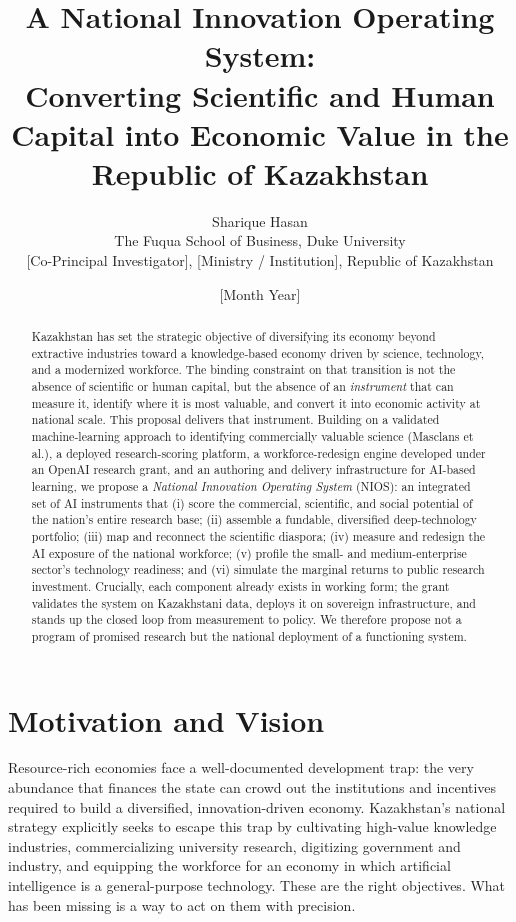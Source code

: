 \documentclass[11pt]{article}
\title{\bfseries A National Innovation Operating System:\\
Converting Scientific and Human Capital into Economic Value in the Republic of Kazakhstan}
\author{
  Sharique Hasan\\
  \small The Fuqua School of Business, Duke University\\[4pt]
  [Co-Principal Investigator], [Ministry / Institution], Republic of Kazakhstan
}
\date{[Month Year]}
\begin{document}
\maketitle

\begin{abstract}
\noindent
Kazakhstan has set the strategic objective of diversifying its economy beyond
extractive industries toward a knowledge-based economy driven by science,
technology, and a modernized workforce. The binding constraint on that
transition is not the absence of scientific or human capital, but the absence of
an \emph{instrument} that can measure it, identify where it is most valuable, and
convert it into economic activity at national scale. This proposal delivers that
instrument. Building on a validated machine-learning approach to identifying
commercially valuable science (Masclans et al.), a deployed research-scoring
platform, a workforce-redesign engine developed under an
OpenAI research grant, and an authoring and delivery infrastructure for AI-based
learning, we propose a \emph{National Innovation Operating System} (NIOS):
an integrated set of AI instruments that (i) score the commercial, scientific,
and social potential of the nation's entire research base; (ii) assemble a
fundable, diversified deep-technology portfolio; (iii) map and reconnect the
scientific diaspora; (iv) measure and redesign the AI exposure of the national
workforce; (v) profile the small- and medium-enterprise sector's technology
readiness; and (vi) simulate the marginal returns to public research investment.
Crucially, each component already exists in working form; the grant validates the
system on Kazakhstani data, deploys it on sovereign infrastructure, and stands up
the closed loop from measurement to policy. We therefore propose not a program of
promised research but the national deployment of a functioning system.
\end{abstract}

\section{Motivation and Vision}

Resource-rich economies face a well-documented development trap: the very
abundance that finances the state can crowd out the institutions and incentives
required to build a diversified, innovation-driven economy. Kazakhstan's national
strategy explicitly seeks to escape this trap by cultivating high-value
knowledge industries, commercializing university research, digitizing government
and industry, and equipping the workforce for an economy in which artificial
intelligence is a general-purpose technology. These are the right objectives.
What has been missing is a way to act on them with precision.
\end{document}

